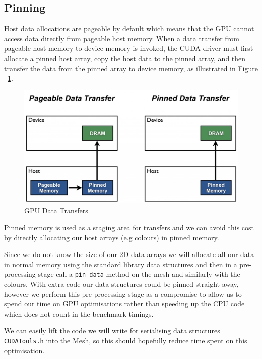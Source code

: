 \subsection*{Pinning}
Host data allocations are pageable by default which means that the GPU cannot access data directly from pageable host memory. When a data transfer from pageable host memory to device memory is invoked, the CUDA driver must first allocate a pinned host array, copy the host data to the pinned array, and then transfer the data from the pinned array to device memory\cite{transfer}, as illustrated in Figure ~\ref{fig:pinning}.
\begin{figure}[H]
  \centering
  \includegraphics[scale=0.3]{images/pinning}
  \caption[pinning]{GPU Data Transfers\cite{transfer}}
  \label{fig:pinning}
\end{figure}
Pinned memory is used as a staging area for transfers and we can avoid this cost by directly allocating our host arrays (e.g colours) in pinned memory.

Since we do not know the size of our 2D data arrays we will allocate all our data in normal memory using the standard library data structures and then in a pre-processing stage call a \verb!pin_data! method on the mesh and similarly with the colours.
With extra code our data structures could be pinned straight away, however we perform this pre-processing stage as a compromise to allow us to spend our time on GPU optimisations rather than speeding up the CPU code which does not count in the benchmark timings.

We can easily lift the code we will write for serialising data structures \verb!CUDATools.h! into the Mesh, so this should hopefully reduce time spent on this optimisation.